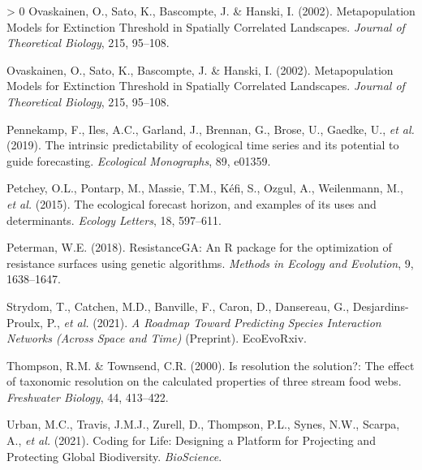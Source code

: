 \documentclass[10pt,oneside]{article}
\newlength{\cslhangindent}
\newenvironment{CSLReferences}[3] %
 {%
  \setlength{\parindent}{0pt}
  \ifodd #1 \everypar{\setlength{\hangindent}{\cslhangindent}}\ignorespaces\fi
  \ifnum #2 > 0
  \setlength{\parskip}{#2\baselineskip}
  \fi
 }%
 {}
\begin{document}
\begin{CSLReferences}{1}{0}
\leavevmode\hypertarget{ref-Ovaskainen2002MetMod}{}%
Ovaskainen, O., Sato, K., Bascompte, J. \& Hanski, I. (2002).
Metapopulation Models for Extinction Threshold in Spatially Correlated
Landscapes. \emph{Journal of Theoretical Biology}, 215, 95--108.

\leavevmode\hypertarget{ref-Ovaskainen2002MetMod}{}%
Ovaskainen, O., Sato, K., Bascompte, J. \& Hanski, I. (2002).
Metapopulation Models for Extinction Threshold in Spatially Correlated
Landscapes. \emph{Journal of Theoretical Biology}, 215, 95--108.

\leavevmode\hypertarget{ref-Pennekamp2019IntPre}{}%
Pennekamp, F., Iles, A.C., Garland, J., Brennan, G., Brose, U., Gaedke,
U., \emph{et al.} (2019). The intrinsic predictability of ecological
time series and its potential to guide forecasting. \emph{Ecological
Monographs}, 89, e01359.

\leavevmode\hypertarget{ref-Petchey2015EcoFor}{}%
Petchey, O.L., Pontarp, M., Massie, T.M., Kéfi, S., Ozgul, A.,
Weilenmann, M., \emph{et al.} (2015). The ecological forecast horizon,
and examples of its uses and determinants. \emph{Ecology Letters}, 18,
597--611.

\leavevmode\hypertarget{ref-Peterman2018ResRP}{}%
Peterman, W.E. (2018). ResistanceGA: An R package for the optimization
of resistance surfaces using genetic algorithms. \emph{Methods in
Ecology and Evolution}, 9, 1638--1647.

\leavevmode\hypertarget{ref-Strydom2021RoaPre}{}%
Strydom, T., Catchen, M.D., Banville, F., Caron, D., Dansereau, G.,
Desjardins-Proulx, P., \emph{et al.} (2021). \emph{A Roadmap Toward
Predicting Species Interaction Networks (Across Space and Time)}
(Preprint). EcoEvoRxiv.

\leavevmode\hypertarget{ref-Thompson2000ResSol}{}%
Thompson, R.M. \& Townsend, C.R. (2000). Is resolution the solution?:
The effect of taxonomic resolution on the calculated properties of three
stream food webs. \emph{Freshwater Biology}, 44, 413--422.

\leavevmode\hypertarget{ref-Urban2021CodLif}{}%
Urban, M.C., Travis, J.M.J., Zurell, D., Thompson, P.L., Synes, N.W.,
Scarpa, A., \emph{et al.} (2021). Coding for Life: Designing a Platform
for Projecting and Protecting Global Biodiversity. \emph{BioScience}.

\end{CSLReferences}
\end{document}
